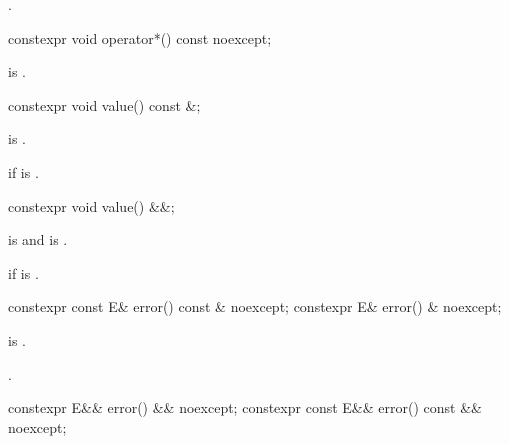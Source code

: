 \begin{itemdescr}
\pnum
\returns
{}.
\end{itemdescr}

%
\begin{itemdecl}
constexpr void operator*() const noexcept;
\end{itemdecl}

\begin{itemdescr}
\pnum
\hardexpects
{} is .
\end{itemdescr}

%
\begin{itemdecl}
constexpr void value() const &;
\end{itemdecl}

\begin{itemdescr}
\pnum
\mandates
{} is .

\pnum
\throws
{} if  is .
\end{itemdescr}

%
\begin{itemdecl}
constexpr void value() &&;
\end{itemdecl}

\begin{itemdescr}
\pnum
\mandates
{} is  and
 is .

\pnum
\throws
{}
if  is .
\end{itemdescr}

%
\begin{itemdecl}
constexpr const E& error() const & noexcept;
constexpr E& error() & noexcept;
\end{itemdecl}

\begin{itemdescr}
\pnum
\hardexpects
{} is .

\pnum
\returns
{}.
\end{itemdescr}

%
\begin{itemdecl}
constexpr E&& error() && noexcept;
constexpr const E&& error() const && noexcept;
\end{itemdecl}


